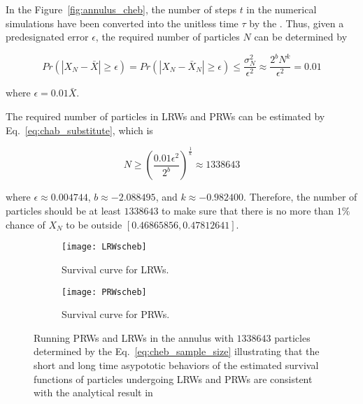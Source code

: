 In the Figure~\ref{fig:annulus_cheb}, the number of steps $t$ in the
numerical simulations have been converted into the unitless time
$\tau$ by the . Thus, given a predesignated error
$\epsilon$, the required number of particles $N$ can be determined by

\begin{equation}\label{eq:chab_substitute}
  Pr(|X_{N} - \bar X| \geq \epsilon) = Pr(|X_{N} - \bar X_{N}| \geq
  \epsilon) \leq \frac{\sigma^2_{N}}{\epsilon^2} \approx \frac{2^b
    N^k}{\epsilon^2} = 0.01
\end{equation}

where $\epsilon = 0.01 \bar X$.

The required number of particles in LRWs and PRWs can be estimated by
Eq.~\ref{eq:chab_substitute}, which is

\begin{equation}\label{eq:cheb_sample_size}
  N \geq (\frac{0.01 \epsilon^2}{2^b})^{\frac{1}{k}} \approx 1338643
\end{equation}

where $\epsilon \approx 0.004744$, $b \approx -2.088495$, and $k
\approx -0.982400$. Therefore, the number of particles should be at
least $1338643$ to make sure that there is no more than $1\%$ chance
of $X_N$ to be outside $[0.46865856, 0.47812641]$.


\begin{figure}
  \begin{subfigure}{0.9\textwidth}
    \centering
    \texttt{[image: LRWscheb]}
    \caption{Survival curve for LRWs.\label{fig:LRW_survival}}
  \end{subfigure}
  \begin{subfigure}{0.9\textwidth}
    \centering
    \texttt{[image: PRWscheb]}
    \caption{Survival curve for PRWs.\label{fig:PRW_survival}}
  \end{subfigure}
  \caption{Running PRWs and LRWs in the annulus with $1338643$
    particles determined by the Eq.~\ref{eq:cheb_sample_size} illustrating
    that the short and long time asypototic behaviors of the estimated
    survival functions of particles undergoing LRWs and PRWs are
    consistent with the analytical result in }
  \label{fig:convergence_test}
\end{figure}

